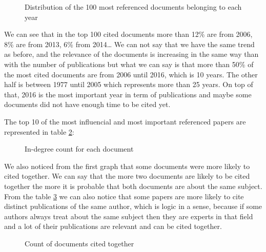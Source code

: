 \documentclass[article,twocolumn]{IEEEtran}
\begin{document}
    \begin{figure}
        \begin{center}\end{center}
        \caption{Distribution of the 100 most referenced documents belonging to each year}
        \label{fig7}
    \end{figure}
    
    We can see that in the top 100 cited documents more than 12\% are from
2006, 8\% are from 2013, 6\% from 2014\ldots{} We can not say that we
have the same trend as before, and the relevance of the documents is
increasing in the same way than with the number of publications but what
we can say is that more than 50\% of the most cited documents are from
2006 until 2016, which is 10 years. The other half is between 1977 until
2005 which represents more than 25 years. On top of that, 2016 is the
most important year in term of publications and maybe some documents did
not have enough time to be cited yet.

    The top 10 of the most influencial and most important referenced papers
are represented in table \ref{indegree}:


    \begin{figure}
        \begin{center}\end{center}
        \caption{In-degree count for each document}
        \label{indegree}
    \end{figure}
    
    We also noticed from the first graph that some documents were more
likely to cited together. We can say that the more two documents are
likely to be cited together the more it is probable that both documents
are about the same subject. From the table \ref{fig8} we can also notice
that some papers are more likely to cite distinct publications of the
same author, which is logic in a sense, because if some authors always
treat about the same subject then they are experts in that field and a
lot of their publications are relevant and can be cited together.


    \begin{figure}
        \begin{center}\end{center}
        \caption{Count of documents cited together}
        \label{fig8}
    \end{figure}
    
\end{document}
